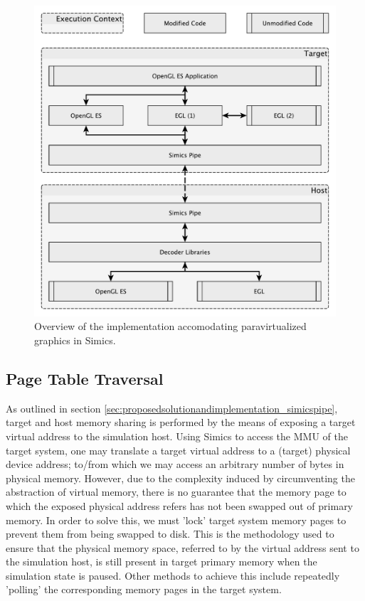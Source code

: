 \begin{figure}
\centering
\includegraphics[width=\linewidth]{img/yedoverview.pdf}
\caption[Paravirtualization implementation overview]{Overview of the implementation accomodating paravirtualized graphics in Simics.}
\label{fig:overview}
\end{figure}

\subsection{Page Table Traversal}
\label{sec:proposedsolutionandimplementation_pagetabletraversal}
As outlined in section \ref{sec:proposedsolutionandimplementation_simicspipe}, target and host memory sharing is performed by the means of exposing a target virtual address to the simulation host.
Using Simics to access the MMU of the target system, one may translate a target virtual address to a (target) physical device address; to/from which we may access an arbitrary number of bytes in physical memory.
However, due to the complexity induced by circumventing the abstraction of virtual memory, there is no guarantee that the memory page to which the exposed physical address refers has not been swapped out of primary memory.
In order to solve this, we must 'lock' target system memory pages to prevent them from being swapped to disk.
This is the methodology used to ensure that the physical memory space, referred to by the virtual address sent to the simulation host, is still present in target primary memory when the simulation state is paused.
Other methods to achieve this include repeatedly 'polling' the corresponding memory pages in the target system.

